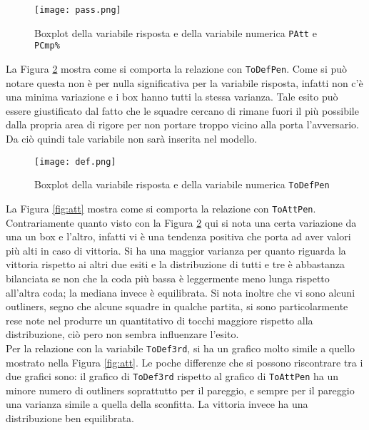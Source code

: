 \begin{figure}[htbp]
	\begin{center}
		\texttt{[image: pass.png]}
		\caption{Boxplot della variabile risposta e della variabile numerica \texttt{PAtt} e \texttt{PCmp\%}  } \label{fig:pass}
	\end{center}
\end{figure}

La Figura \ref{fig:defp} mostra come si comporta la relazione con \texttt{ToDefPen}. Come si può notare questa non è per nulla significativa per la variabile risposta, infatti non c'è una minima variazione e i box hanno tutti la stessa varianza. Tale esito può essere giustificato dal fatto che le squadre cercano di rimane fuori il più possibile dalla propria area di rigore per non portare troppo vicino alla porta l'avversario. Da ciò quindi tale variabile non sarà inserita nel modello.\\

\begin{figure}[htbp]
	\begin{center}
		\texttt{[image: def.png]}
		\caption{Boxplot della variabile risposta e della variabile numerica \texttt{ToDefPen} } \label{fig:defp}
	\end{center}
\end{figure}

La Figura \ref{fig:att} mostra come si comporta la relazione con \texttt{ToAttPen}. Contrariamente quanto visto con la Figura \ref{fig:defp} qui si nota una certa variazione da una un box e l'altro, infatti vi è una tendenza positiva che porta ad aver valori più alti in caso di vittoria. Si ha una maggior varianza per quanto riguarda la vittoria rispetto ai altri due esiti e la distribuzione di tutti e tre è abbastanza bilanciata se non che la coda più bassa è leggermente meno lunga rispetto all'altra coda; la mediana invece è equilibrata. Si nota inoltre che vi sono alcuni outliners, segno che alcune squadre in qualche partita, si sono particolarmente rese note nel produrre un quantitativo di tocchi maggiore rispetto alla distribuzione, ciò pero non sembra influenzare l'esito.\\

Per la relazione con la variabile \texttt{ToDef3rd}, si ha un grafico molto simile a quello mostrato nella Figura \ref{fig:att}. Le poche differenze che si possono riscontrare tra i due grafici sono: il grafico di \texttt{ToDef3rd} rispetto al grafico di \texttt{ToAttPen} ha un minore numero di outliners soprattutto per il pareggio, e sempre per il pareggio una varianza simile a quella della sconfitta. La vittoria invece ha una distribuzione ben equilibrata.\\

